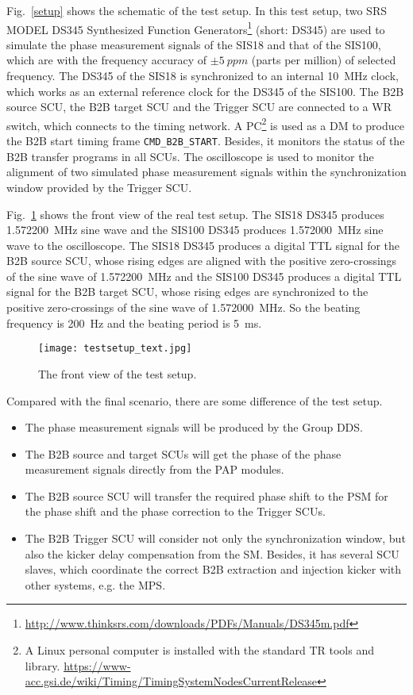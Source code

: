 Fig.~\ref{setup} shows the schematic of the test setup. In this test setup, two SRS MODEL DS345 Synthesized Function Generators\footnote{\url{http://www.thinksrs.com/downloads/PDFs/Manuals/DS345m.pdf}} (short: DS345) are used to simulate the phase measurement signals of the SIS18 and that of the SIS100, which are with the frequency accuracy of $\pm\SI{5}{ppm}$ (parts per million) of selected frequency. The DS345 of the SIS18 is synchronized to an internal \SI{10}{\MHz} clock, which works as an external reference clock for the DS345 of the SIS100. The B2B source SCU, the B2B target SCU and the Trigger SCU are connected to a WR switch, which connects to the timing network. A \gls{PC}\footnote{A Linux personal computer is installed with the standard TR tools and library. \newline\url{https://www-acc.gsi.de/wiki/Timing/TimingSystemNodesCurrentRelease}} is used as a DM to produce the B2B start timing frame \verb|CMD_B2B_START|. Besides, it monitors the status of the B2B transfer programs in all SCUs. The oscilloscope is used to monitor the alignment of two simulated phase measurement signals within the synchronization window provided by the Trigger SCU.   

Fig.~\ref{testsetup_text} shows the front view of the real test setup. The SIS18 DS345 produces \SI{1.572200}{\MHz} sine wave and the SIS100 DS345 produces \SI{1.572000}{\MHz} sine wave to the oscilloscope. The SIS18 DS345 produces a digital TTL signal for the B2B source SCU, whose rising edges are aligned with the positive zero-crossings of the sine wave of \SI{1.572200}{\MHz} and the SIS100 DS345 produces a digital TTL signal for the B2B target SCU, whose rising edges are synchronized to the positive zero-crossings of the sine wave of \SI{1.572000}{\MHz}. So the beating frequency is \SI{200}{\Hz} and the beating period is \SI{5}{\ms}. 
\begin{figure}[!htb]
   \centering   
   \texttt{[image: testsetup\_text.jpg]}
   \caption{The front view of the test setup.}
   \label{testsetup_text}
\end{figure}

Compared with the final scenario, there are some difference of the test setup.
\begin{itemize}
\item
The phase measurement signals will be produced by the Group DDS. 
\item 
The B2B source and target SCUs will get the phase of the phase measurement signals directly from the PAP modules. 
\item 
The B2B source SCU will transfer the required phase shift to the PSM for the phase shift and the phase correction to the Trigger SCUs.
\item 
The B2B Trigger SCU will consider not only the synchronization window, but also the kicker delay compensation from the SM. Besides, it has several SCU slaves, which coordinate the correct B2B extraction and injection kicker with other systems, e.g. the MPS.
\end{itemize}

